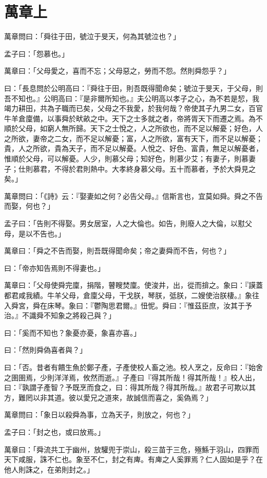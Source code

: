 \documentclass[12pt,a4paper]{ctexbook}
\begin{document}
\section{萬章上}
萬章問曰：「舜往于田，號泣于旻天，何為其號泣也？」\par
孟子曰：「怨慕也。」\par
萬章曰：「父母愛之，喜而不忘；父母惡之，勞而不怨。然則舜怨乎？」\par
曰：「長息問於公明高曰：『舜往于田，則吾既得聞命矣；號泣于旻天，于父母，則吾不知也。』公明高曰：『是非爾所知也。』夫公明高以孝子之心，為不若是恝，我竭力耕田，共為子職而已矣，父母之不我愛，於我何哉？帝使其子九男二女，百官牛羊倉廩備，以事舜於畎畝之中。天下之士多就之者，帝將胥天下而遷之焉。為不順於父母，如窮人無所歸。天下之士悅之，人之所欲也，而不足以解憂；好色，人之所欲，妻帝之二女，而不足以解憂；富，人之所欲，富有天下，而不足以解憂；貴，人之所欲，貴為天子，而不足以解憂。人悅之、好色、富貴，無足以解憂者，惟順於父母，可以解憂。人少，則慕父母；知好色，則慕少艾；有妻子，則慕妻子；仕則慕君，不得於君則熱中。大孝終身慕父母。五十而慕者，予於大舜見之矣。」\par
萬章問曰：「《詩》云：『娶妻如之何？必告父母。』信斯言也，宜莫如舜。舜之不告而娶，何也？」\par
孟子曰：「告則不得娶。男女居室，人之大倫也。如告，則廢人之大倫，以懟父母，是以不告也。」\par
萬章曰：「舜之不告而娶，則吾既得聞命矣；帝之妻舜而不告，何也？」\par
曰：「帝亦知告焉則不得妻也。」\par
萬章曰：「父母使舜完廩，捐階，瞽瞍焚廩。使浚井，出，從而揜之。象曰：『謨蓋都君咸我績。牛羊父母，倉廩父母，干戈朕，琴朕，弤朕，二嫂使治朕棲。』象往入舜宮，舜在床琴。象曰：『鬱陶思君爾。』忸怩。舜曰：『惟茲臣庶，汝其于予治。』不識舜不知象之將殺己與？」\par
曰：「奚而不知也？象憂亦憂，象喜亦喜。」\par
曰：「然則舜偽喜者與？」\par
曰：「否。昔者有饋生魚於鄭子產，子產使校人畜之池。校人烹之，反命曰：『始舍之圉圉焉，少則洋洋焉，攸然而逝。』子產曰『得其所哉！得其所哉！』校人出，曰：『孰謂子產智？予既烹而食之，曰：得其所哉？得其所哉。』故君子可欺以其方，難罔以非其道。彼以愛兄之道來，故誠信而喜之，奚偽焉？」\par
萬章問曰：「象日以殺舜為事，立為天子，則放之，何也？」\par
孟子曰：「封之也，或曰放焉。」\par
萬章曰：「舜流共工于幽州，放驩兜于崇山，殺三苗于三危，殛鯀于羽山，四罪而天下咸服，誅不仁也。象至不仁，封之有庳。有庳之人奚罪焉？仁人固如是乎？在他人則誅之，在弟則封之。」\par
\end{document}
